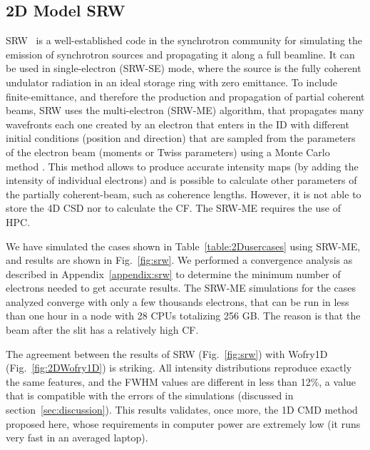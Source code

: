 \documentclass{iucr}              %
\begin{document}
\subsection{2D Model SRW}
SRW~\cite{codeSRW} is a well-established code in the synchrotron community for simulating the emission of synchrotron sources and propagating it along a full beamline. It can be used in single-electron (SRW-SE) mode, where the source is the fully coherent undulator radiation in an ideal storage ring with zero emittance. To include finite-emittance, and therefore the production and propagation of partial coherent beams, SRW uses the multi-electron (SRW-ME) algorithm, that propagates many wavefronts each one created by an electron that enters in the ID with different initial conditions (position and direction) that are sampled from the parameters of the electron beam (moments or Twiss parameters) using a Monte Carlo method \cite{codeSRW_ME}. This method allows to produce accurate intensity maps (by adding the intensity of individual electrons) and is possible to calculate other parameters of the partially coherent-beam, such as coherence lengths. However, it is not able to store the 4D CSD nor to calculate the CF. The SRW-ME requires the use of HPC. 

We have simulated the cases shown in Table~\ref{table:2Dusercases} using SRW-ME, and results are shown in Fig.~\ref{fig:srw}. We performed a convergence analysis as described in Appendix~\ref{appendix:srw} to determine the minimum number of electrons needed to get accurate results. The SRW-ME simulations for the cases analyzed converge with only a few thousands electrons, that can be run in less than one hour in a node with 28 CPUs totalizing 256 GB. The reason is that the beam after the slit has a relatively high CF. 

The agreement between the results of SRW (Fig.~\ref{fig:srw}) with Wofry1D (Fig.~\ref{fig:2DWofry1D}) is striking. All intensity distributions reproduce exactly the same features, and the FWHM values are different in less than 12\%, a value that is compatible with the errors of the simulations (discussed in section~\ref{sec:discussion}). This results validates, once more, the 1D CMD method proposed here, whose requirements in computer power are extremely low (it runs very fast in an averaged laptop).  
\end{document}
